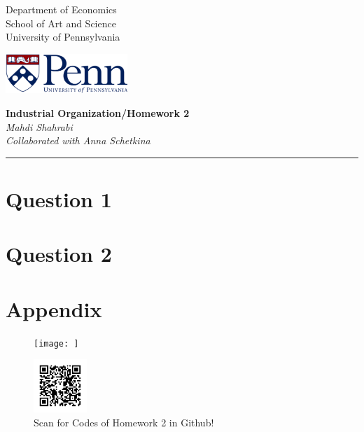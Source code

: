 \documentclass[11pt,letterpaper]{article}
\begin{document}
\usetikzlibrary{positioning}
\pagestyle{plain}
\begin{flushleft}
Department of Economics \hfill \\
School of Art and Science\\
University of Pennsylvania
\end{flushleft}

\begin{flushright}\vspace{-2cm}
\includegraphics[height=1.5cm]{Attachments/Logo.png}
\end{flushright}
 
\begin{center}\vspace{1cm}
\textbf{\large Industrial Organization/Homework 2}\\   %
\textit{Mahdi Shahrabi} \\\textit{Collaborated with Anna Schetkina}\\                         %

\end{center}
\rule{\linewidth}{0.4mm}

\section{Question 1}


\newpage
\section{Question 2}


\newpage
\section{Appendix}
\begin{figure}[h]
    \centering
    \texttt{[image: ]}
    \caption{Scan for Codes of Homework 2 in Github!}
\includegraphics[height=2cm]{Attachments/QR.png}
\end{figure}


\end{document}
